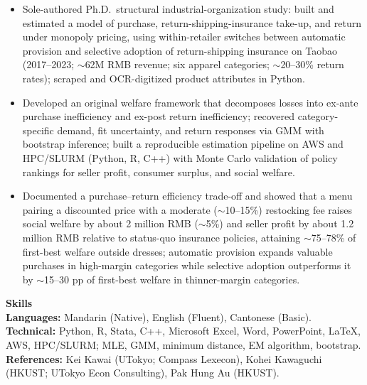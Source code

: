 \documentclass[11pt,letterpaper]{article}
\begin{document}
\begin{itemize}
  \item Sole-authored Ph.D.\ structural industrial-organization study: built and estimated a model of purchase, return-shipping-insurance take-up, and return under monopoly pricing, using within-retailer switches between automatic provision and selective adoption of return-shipping insurance on Taobao (2017--2023; \(\sim\)62M RMB revenue; six apparel categories; \(\sim\)20--30\% return rates); scraped and OCR-digitized product attributes in Python.
  \item Developed an original welfare framework that decomposes losses into ex-ante purchase inefficiency and ex-post return inefficiency; recovered category-specific demand, fit uncertainty, and return responses via GMM with bootstrap inference; built a reproducible estimation pipeline on AWS and HPC/SLURM (Python, R, C++) with Monte Carlo validation of policy rankings for seller profit, consumer surplus, and social welfare.
  \item Documented a purchase--return efficiency trade-off and showed that a menu pairing a discounted price with a moderate (\(\sim\)10--15\%) restocking fee raises social welfare by about 2 million RMB (\(\sim\)5\%) and seller profit by about 1.2 million RMB relative to status-quo insurance policies, attaining \(\sim\)75--78\% of first-best welfare outside dresses; automatic provision expands valuable purchases in high-margin categories while selective adoption outperforms it by \(\sim\)15--30 pp of first-best welfare in thinner-margin categories.
\end{itemize}

\vspace{0.15pt}

{\large \textbf{Skills}}\\[-0.5pt]
\textbf{Languages:} Mandarin (Native), English (Fluent), Cantonese (Basic).\\
\textbf{Technical:} Python, R, Stata, C++, Microsoft Excel, Word, PowerPoint, \LaTeX, AWS, HPC/SLURM; MLE, GMM, minimum distance, EM algorithm, bootstrap.\\
\textbf{References:} Kei Kawai (UTokyo; Compass Lexecon), Kohei Kawaguchi (HKUST; UTokyo Econ Consulting), Pak Hung Au (HKUST).
\end{document}
